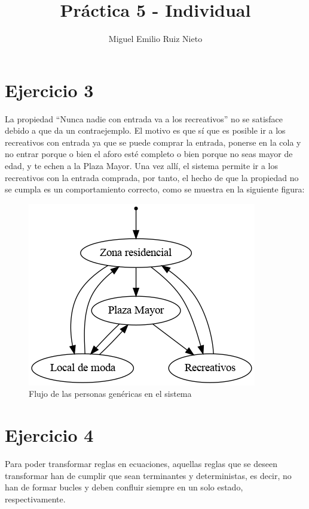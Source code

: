 \documentclass[a4paper,11pt]{report}
\begin{document}
	\title{Práctica 5 - Individual}
	\author{
		Miguel Emilio Ruiz Nieto
	}

	\maketitle

  \section*{Ejercicio 3}

  La propiedad ``Nunca nadie con entrada va a los recreativos'' no se satisface
  debido a que da un contraejemplo. El motivo es que sí que es posible ir a los
  recreativos con entrada ya que se puede comprar la entrada, ponerse en la
  cola y no entrar porque o bien el aforo esté completo o bien porque no seas
  mayor de edad, y te echen a la Plaza Mayor. Una vez allí, el sistema permite
  ir a los recreativos con la entrada comprada, por tanto, el hecho de que la
  propiedad no se cumpla es un comportamiento correcto, como se muestra en la
  siguiente figura:
  \begin{figure}[h]
    \includegraphics[scale=0.5]{lugares.png}
    \centering
    \caption{Flujo de las personas genéricas en el sistema}
  \end{figure}

  \section*{Ejercicio 4}
  Para poder transformar reglas en ecuaciones, aquellas reglas que se deseen
  transformar han de cumplir que sean terminantes y deterministas, es decir, no
  han de formar bucles y deben confluir siempre en un solo estado, respectivamente.
\end{document}
